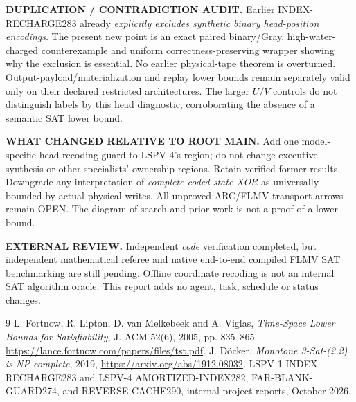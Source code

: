 \documentclass[10pt]{article}
\begin{document}
\noindent\textbf{DUPLICATION / CONTRADICTION AUDIT.} Earlier INDEX-RECHARGE283 already \emph{explicitly excludes synthetic binary head-position encodings}. The present new point is an exact paired binary/Gray, high-water-charged counterexample and uniform correctness-preserving wrapper showing why the exclusion is essential. No earlier physical-tape theorem is overturned. Output-payload/materialization and replay lower bounds remain separately valid only on their declared restricted architectures. The larger $U/V$ controls do not distinguish labels by this head diagnostic, corroborating the absence of a semantic SAT lower bound.

\noindent\textbf{WHAT CHANGED RELATIVE TO ROOT MAIN.} Add one model-specific head-recoding guard to LSPV-4's region; do not change executive synthesis or other specialists' ownership regions. Retain verified former results, Downgrade any interpretation of \emph{complete coded-state XOR} as universally bounded by actual physical writes. All unproved ARC/FLMV transport arrows remain OPEN. The diagram of search and prior work is not a proof of a lower bound.

\noindent\textbf{EXTERNAL REVIEW.} Independent \emph{code} verification completed, but independent mathematical referee and native end-to-end compiled FLMV SAT benchmarking are still pending. Offline coordinate recoding is not an internal SAT algorithm oracle. This report adds no agent, task, schedule or status changes.

\begin{thebibliography}{9}
 L. Fortnow, R. Lipton, D. van Melkebeek and A. Viglas, \emph{Time-Space Lower Bounds for Satisfiability}, J. ACM 52(6), 2005, pp. 835--865. \url{https://lance.fortnow.com/papers/files/tst.pdf}.
 J. D\"ocker, \emph{Monotone 3-Sat-(2,2) is NP-complete}, 2019, \url{https://arxiv.org/abs/1912.08032}.
 LSPV-1 INDEX-RECHARGE283 and LSPV-4 AMORTIZED-INDEX282, FAR-BLANK-GUARD274, and REVERSE-CACHE290, internal project reports, October 2026.
\end{thebibliography}
\end{document}
